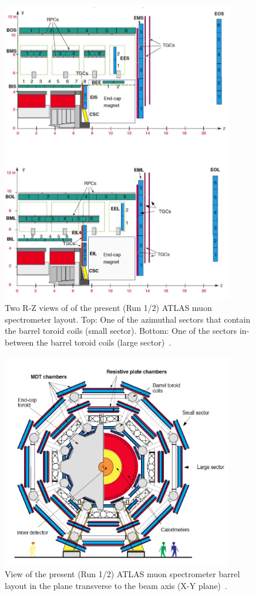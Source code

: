 \begin{figure}[!h]
	\centering
	\includegraphics[width=0.9\textwidth]{Chapters/CH3/figures/MS_rz}
	\caption{Two R-Z views of of the present (Run 1/2) ATLAS muon spectrometer layout. Top: One of the azimuthal sectors that contain the barrel toroid coils (small sector). Bottom: One of the sectors in-between the barrel toroid coils (large sector)~\cite{TDR}.}
	\label{fig:MS_rz}
\end{figure}
\begin{figure}[!h]
	\centering
	\includegraphics[width=0.9\textwidth]{Chapters/CH3/figures/MS_xy}
	\caption{View of the present (Run 1/2) ATLAS muon spectrometer barrel layout in the plane transverse to the beam axis (X-Y plane)~\cite{TDR}.}
	\label{fig:MS_xy2}
\end{figure}
